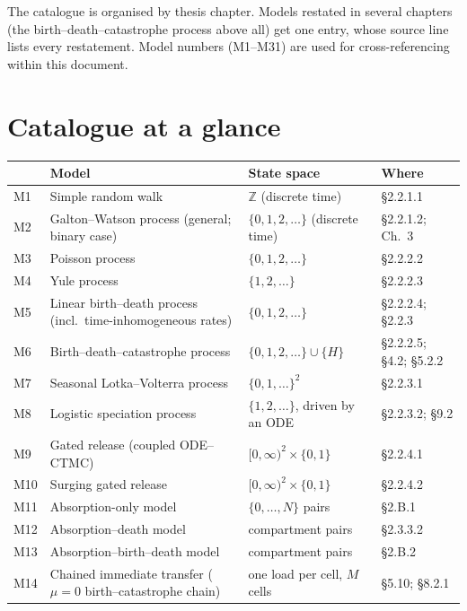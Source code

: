 \documentclass[11pt,a4paper]{report}
\theoremstyle{definition}
\begin{document}
The catalogue is organised by thesis chapter. Models restated in several
chapters (the birth--death--catastrophe process above all) get one entry,
whose source line lists every restatement. Model numbers (M1--M31) are used
for cross-referencing within this document.

\chapter{Catalogue at a glance}

{\small
\begin{longtable}{@{}p{}p{}p{}p{}@{}}
\toprule
& Model & State space & Where \\
\midrule
\endhead
M1 & Simple random walk & $\mathbb{Z}$ (discrete time) & \S2.2.1.1 \\
M2 & Galton--Watson process (general; binary case) & $\{0,1,2,\ldots\}$ (discrete time) & \S2.2.1.2; Ch.~3 \\
M3 & Poisson process & $\{0,1,2,\ldots\}$ & \S2.2.2.2 \\
M4 & Yule process & $\{1,2,\ldots\}$ & \S2.2.2.3 \\
M5 & Linear birth--death process (incl.\ time-inhomogeneous rates) & $\{0,1,2,\ldots\}$ & \S2.2.2.4; \S2.2.3 \\
M6 & Birth--death--catastrophe process & $\{0,1,2,\ldots\}\cup\{H\}$ & \S2.2.2.5; \S4.2; \S5.2.2 \\
M7 & Seasonal Lotka--Volterra process & $\{0,1,\ldots\}^2$ & \S2.2.3.1 \\
M8 & Logistic speciation process & $\{1,2,\ldots\}$, driven by an ODE & \S2.2.3.2; \S9.2 \\
M9 & Gated release (coupled ODE--CTMC) & $[0,\infty)^2\times\{0,1\}$ & \S2.2.4.1 \\
M10 & Surging gated release & $[0,\infty)^2\times\{0,1\}$ & \S2.2.4.2 \\
M11 & Absorption-only model & $\{0,\ldots,N\}$ pairs & \S2.B.1 \\
M12 & Absorption--death model & compartment pairs & \S2.3.3.2 \\
M13 & Absorption--birth--death model & compartment pairs & \S2.B.2 \\
M14 & Chained immediate transfer ($\mu=0$ birth--catastrophe chain) & one load per cell, $M$ cells & \S5.10; \S8.2.1 \\

\end{longtable}}
\end{document}
